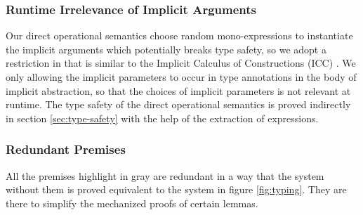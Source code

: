 \subsubsection{Runtime Irrelevance of Implicit Arguments}

Our direct operational semantics choose random mono-expressions to instantiate
the implicit arguments which potentially breaks type safety, so we adopt a
restriction in  that is similar to the
Implicit Calculus of Constructions (ICC) \cite{miquel2001implicit}.
We only allowing the implicit parameters to occur in type annotations in the
body of implicit abstraction, so that the choices of implicit parameters is not
relevant at runtime. The type safety of the direct operational semantics is
proved indirectly in section \ref{sec:type-safety} with the help of the
extraction of expressions.

\subsubsection{Redundant Premises}

All the premises highlight in gray are redundant in a way that
the system without them is proved equivalent to the system in figure \ref{fig:typing}.
They are there to simplify the mechanized proofs of certain lemmas.

